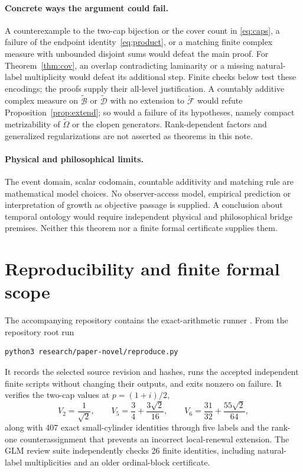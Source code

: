 \documentclass[11pt]{article}
\theoremstyle{definition}
\newcommand{\Om}{\widetilde\Omega}
\newcommand{\F}{\widetilde{\mathcal F}}
\newcommand{\D}{\widetilde{\mathcal D}}
\newcommand{\Bt}{\widetilde{\mathcal B}}
\begin{document}
\paragraph{Concrete ways the argument could fail.}
A counterexample to the two-cap bijection or the cover count in
\eqref{eq:caps}, a failure of the endpoint identity~\eqref{eq:product}, or a
matching finite complex measure with unbounded disjoint sums would defeat
the main proof. For Theorem~\ref{thm:cov}, an overlap contradicting laminarity
or a missing natural-label multiplicity would defeat its additional step.
Finite checks below test these encodings; the proofs supply their all-level
justification. A countably additive complex measure on $\Bt$ or $\D$ with no extension to
$\F$ would refute Proposition~\ref{prop:extend}; so would a failure of its
hypotheses, namely compact metrizability of $\Om$ or the clopen generators.
Rank-dependent factors and generalized regularizations are
not asserted as theorems in this note.

\paragraph{Physical and philosophical limits.}
The event domain, scalar codomain, countable additivity and matching rule are
mathematical model choices. No observer-access model, empirical prediction or
interpretation of growth as objective passage is supplied. A conclusion about
temporal ontology would require independent physical and philosophical bridge
premises. Neither this theorem nor a finite formal certificate supplies them.

\appendix
\section{Reproducibility and finite formal scope}\label{app:repro}
The accompanying repository contains the exact-arithmetic runner
. From the repository root run
\begin{verbatim}
python3 research/paper-novel/reproduce.py
\end{verbatim}
It records the selected source revision and hashes, runs the accepted
independent finite scripts without changing their outputs, and exits nonzero
on failure. It verifies the two-cap values at $p=(1+i)/2$,
\[
 V_2=\frac1{\sqrt2},\qquad
 V_5=\frac34+\frac{3\sqrt2}{16},\qquad
 V_6=\frac{31}{32}+\frac{55\sqrt2}{64},
\]
along with 407 exact small-cylinder identities through five labels and the
rank-one counterassignment that prevents an incorrect local-renewal extension.
The GLM review suite independently checks 26 finite identities, including
natural-label multiplicities and an older ordinal-block certificate.
\end{document}

